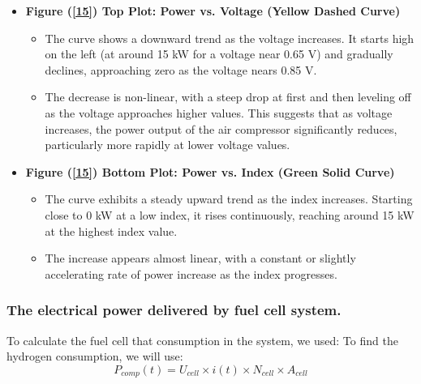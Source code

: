\documentclass[12pt,a4paper]{article}
\numberwithin{equation}{section}
\begin{document}
{\begin{itemize}
	\item \textbf{Figure (\ref{15}) Top Plot: Power vs. Voltage (Yellow Dashed Curve)}
	\begin{itemize}
		\item The curve shows a downward trend as the voltage increases. It starts high on the left (at around 15 kW for a voltage near 0.65 V) and gradually declines, approaching zero as the voltage nears 0.85 V.
		\item The decrease is non-linear, with a steep drop at first and then leveling off as the voltage approaches higher values. This suggests that as voltage increases, the power output of the air compressor significantly reduces, particularly more rapidly at lower voltage values.
	\end{itemize}
	\item \textbf{Figure (\ref{15}) Bottom Plot: Power vs. Index (Green Solid Curve)}
	\begin{itemize}
		\item The curve exhibits a steady upward trend as the index increases. Starting close to 0 kW at a low index, it rises continuously, reaching around 15 kW at the highest index value.
		\item The increase appears almost linear, with a constant or slightly accelerating rate of power increase as the index progresses.
	\end{itemize}
\end{itemize}





\subsubsection{The electrical power delivered by fuel cell system.}

To calculate the fuel cell that consumption in the system, we used: 
To find the hydrogen consumption, we will use: 
\begin{equation}
	P_{comp}(t) = U_{cell}\times i(t) \times N_{cell} \times A_{cell} \label{eq2.6}
\end{equation}

}
\end{document}
